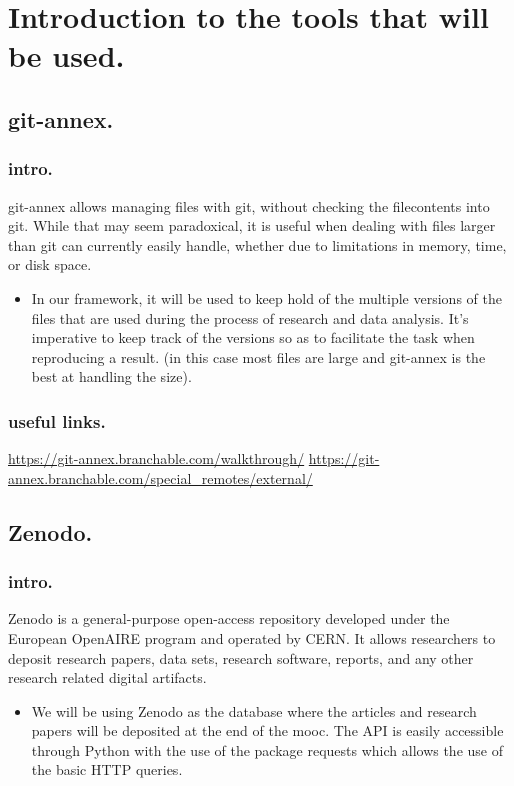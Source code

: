 \documentclass[11pt]{article}
\author{oumaima}
\date{\today}
\title{}
\begin{document}
\tableofcontents

\section{Introduction to the tools that will be used.}
\label{sec:org064e0de}
\subsection{git-annex.}
\label{sec:org6637abe}
\subsubsection{intro.}
\label{sec:org6fabc52}
git-annex allows managing files with git, without checking the
filecontents into git. While that may seem paradoxical, it is
useful when dealing with files larger than git can currently
easily handle, whether due to limitations in memory, time, or disk
space.
\begin{itemize}
\item In our framework, it will be used to keep hold of the multiple
versions of the files that are used during the process of research
and data analysis. It's imperative to keep track of the versions so
as to facilitate the task when reproducing a result.
(in this case most files are large and git-annex is the best at
handling the size).
\end{itemize}
\subsubsection{useful links.}
\label{sec:orgb4d9fa8}
\url{https://git-annex.branchable.com/walkthrough/}
\url{https://git-annex.branchable.com/special\_remotes/external/}


\subsection{Zenodo.}
\label{sec:orgfa39c40}
\subsubsection{intro.}
\label{sec:org3192ddb}
Zenodo is a general-purpose open-access repository developed under
the European OpenAIRE program and operated by CERN. It allows
researchers to deposit research papers, data sets, research
software, reports, and any other research related digital
artifacts.
\begin{itemize}
\item We will be using Zenodo as the database where the articles and
research papers will be deposited at the end of the mooc. The API
is easily accessible through Python with the use of the package
requests which allows the use of the basic HTTP queries.
\end{itemize}
\end{document}
